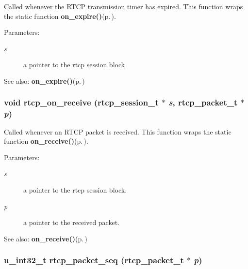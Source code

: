 Called whenever the RTCP transmission timer has expired. This function wraps the static function {\bf on\_\-expire()}{\rm (p.\,\pageref{rtcp_8c_a16})}. \begin{Desc}
\item[Parameters:]
\begin{description}
\item[{\em s}]a pointer to the rtcp session block \end{description}
\end{Desc}
\begin{Desc}
\item[See also:]{\bf on\_\-expire()}{\rm (p.\,\pageref{rtcp_8c_a16})} \end{Desc}
\subsubsection{\setlength{\rightskip}{0pt plus 5cm}void rtcp\_\-on\_\-receive ({\bf rtcp\_\-session\_\-t} $\ast$ {\em s}, {\bf rtcp\_\-packet\_\-t} $\ast$ {\em p})}\label{rtcp_8h_a13}


Called whenever an RTCP packet is received. This function wraps the static function {\bf on\_\-receive()}{\rm (p.\,\pageref{rtcp_8c_a15})}. \begin{Desc}
\item[Parameters:]
\begin{description}
\item[{\em s}]a pointer to the rtcp session block. \item[{\em p}]a pointer to the received packet. \end{description}
\end{Desc}
\begin{Desc}
\item[See also:]{\bf on\_\-receive()}{\rm (p.\,\pageref{rtcp_8c_a15})} \end{Desc}
\subsubsection{\setlength{\rightskip}{0pt plus 5cm}u\_\-int32\_\-t rtcp\_\-packet\_\-seq ({\bf rtcp\_\-packet\_\-t} $\ast$ {\em p})\hspace{0.3cm}{\tt  [static]}}\label{rtcp_8h_a26}


